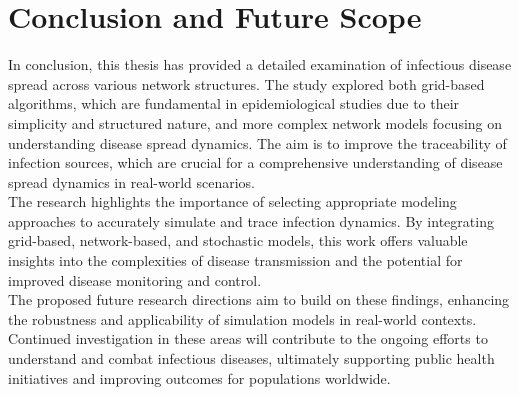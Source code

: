 \chapter{Conclusion and Future Scope}

In conclusion, this thesis has provided a detailed examination of infectious disease spread across various network structures. The study explored both grid-based algorithms, which are fundamental in epidemiological studies due to their simplicity and structured nature, and more complex network models focusing on understanding disease spread dynamics.  The aim is to improve the traceability of infection sources, which are crucial for a comprehensive understanding of disease spread dynamics in real-world scenarios. \\ 

The research highlights the importance of selecting appropriate modeling approaches to accurately simulate and trace infection dynamics.  By integrating grid-based, network-based, and stochastic models, this work offers valuable insights into the complexities of disease transmission and the potential for improved disease monitoring and control.\\

The proposed future research directions aim to build on these findings, enhancing the robustness and applicability of simulation models in real-world contexts. Continued investigation in these areas will contribute to the ongoing efforts to understand and combat infectious diseases, ultimately supporting public health initiatives and improving outcomes for populations worldwide.